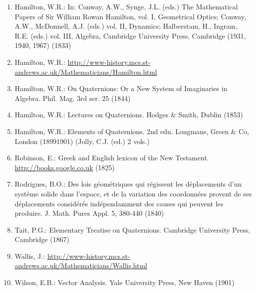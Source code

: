 \begin{enumerate}
  \item Hamilton, W.R.: In: Conway, A.W., Synge, J.L. (eds.) The Mathematical Papers of Sir William Rowan Hamilton, vol. I, Geometrical Optics; Conway, A.W., McDonnell, A.J. (eds.) vol. II, Dynamics; Halberstam, H., Ingram, R.E. (eds.) vol. III, Algebra, Cambridge University Press, Cambridge (1931, 1940, 1967) (1833)

  \item Hamilton, W.R.: \href{http://www-history.mcs.st-andrews.ac.uk/Mathematicians/Hamilton.html}{http://www-history.mcs.st-andrews.ac.uk/Mathematicians/Hamilton.html}

  \item Hamilton, W.R.: On Quaternions: Or a New System of Imaginaries in Algebra. Phil. Mag. 3rd ser. 25 (1844)

  \item Hamilton, W.R.: Lectures on Quaternions. Hodges \& Smith, Dublin (1853)

  \item Hamilton, W.R.: Elements of Quaternions. 2nd edn. Longmans, Green \& Co, London (18991901) (Jolly, C.J. (ed.) 2 vols.)

  \item Robinson, E.: Greek and English lexicon of the New Testament. \href{http://books.google.co.uk}{http://books.google.co.uk} (1825)

  \item Rodrigues, B.O.: Des lois géométriques qui régissent les déplacements d'un système solide dans l'espace, et de la variation des coordonnées provent de ses déplacements considérés indépendamment des causes qui peuvent les produire. J. Math. Pures Appl. 5, 380-440 (1840)

  \item Tait, P.G.: Elementary Treatise on Quaternions. Cambridge University Press, Cambridge (1867) 
  \item Wallis, J.: \href{http://www-history.mcs.st-andrews.ac.uk/Mathematicians/Wallis.html}{http://www-history.mcs.st-andrews.ac.uk/Mathematicians/Wallis.html}

  \item Wilson, E.B.: Vector Analysis. Yale University Press, New Haven (1901)

\end{enumerate}

